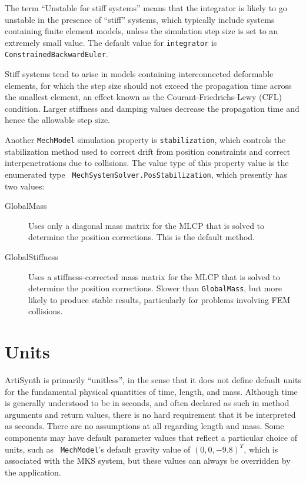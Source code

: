 The term ``Unstable for stiff systems'' means that the integrator is
likely to go unstable in the presence of ``stiff'' systems, which
typically include systems containing finite element models, unless the
simulation step size is set to an extremely small value.  The default
value for {\tt integrator} is {\tt ConstrainedBackwardEuler}.

\begin{sideblock}
Stiff systems tend to arise in models containing interconnected
deformable elements, for which the step size should not exceed the
propagation time across the smallest element, an effect known as the
Courant-Friedrichs-Lewy (CFL) condition. Larger stiffness and damping
values decrease the propagation time and hence the allowable step
size.
\end{sideblock}

Another {\tt MechModel} simulation property is {\tt stabilization},
which controls the stabilization method used to correct drift from
position constraints and correct interpenetrations due to collisions.
The value type of this property value is the enumerated type {\tt
MechSystemSolver.PosStabilization}, which presently has two values:

\begin{description}

\item[GlobalMass]\mbox{}

Uses only a diagonal mass matrix for the MLCP that is solved to
determine the position corrections. This is the default method.

\item[GlobalStiffness]\mbox{}

Uses a stiffness-corrected mass matrix for the MLCP that is solved to
determine the position corrections. Slower than {\tt GlobalMass}, but
more likely to produce stable results, particularly for
problems involving FEM collisions.

\end{description}

\section{Units}
\label{sec:mechii:units}

ArtiSynth is primarily ``unitless'', in the sense that it does not
define default units for the fundamental physical quantities of time,
length, and mass. Although time is
generally understood to be in seconds, and often declared as such in
method arguments and return values, there is no hard requirement that
it be interpreted as seconds. There are no assumptions at all
regarding length and mass. Some components may have default parameter
values that reflect a particular choice of units, such as {\tt
MechModel}'s default gravity value of $(0, 0, -9.8)^T$, which is
associated with the MKS system, but these values can always be
overridden by the application.

